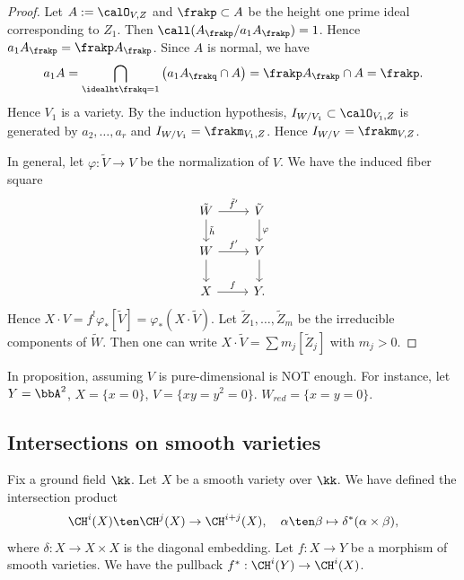 \begin{proof}
    Let $A := \calO_{V,Z}$ and $\frakp \subset A$ be the height one prime ideal corresponding to $Z_1$.
    Then $\call(A_\frakp/a_1 A_\frakp) = 1$.
    Hence $a_1 A_\frakp = \frakp A_\frakp$.
    Since $A$ is normal, we have 
    \[ a_1 A = \bigcap_{\idealht \frakq = 1} \left( a_1 A_\frakq \cap A \right) = \frakp A_\frakp \cap A = \frakp. \]
    Hence $V_1$ is a variety.
    By the induction hypothesis, $I_{W/V_1} \subset \calO_{V_1, Z}$ is generated by $a_2, \dots, a_r$ and $I_{W/V_1} = \frakm_{V_1, Z}$.
    Hence $I_{W/V} = \frakm_{V,Z}$.

    In general, let $\varphi: \tilde{V} \to V$ be the normalization of $V$.
    We have the induced fiber square
    \[
      \begin{tikzcd}
        \tilde{W} \arrow[d, "\tilde{h}"] \arrow[r, "\tilde{f}'"] & \tilde{V} \ar[d, "\varphi"] \\
        W \arrow[r, "f'"] \ar[d] & V \ar[d] \\
        X \arrow[r, "f"]  & Y.
      \end{tikzcd}
    \]
    Hence $X \cdot V = f^! \varphi_* [\tilde{V}] = \varphi_* (X \cdot \tilde{V})$.
    Let $\tilde{Z}_1, \dots, \tilde{Z}_m$ be the irreducible components of $\tilde{W}$.
    Then one can write $X \cdot \tilde{V} = \sum m_j [\tilde{Z}_j]$ with $m_j > 0$.

    \Yang{}
  \end{proof}

  \begin{example}
    In proposition\Yang{}, assuming $V$ is pure-dimensional is NOT enough.
    For instance, let $Y = \bbA^2$, $X = \{x=0\}$, $V = \{xy=y^2=0\}$.
    $W_{red} = \{x=y=0\}$.

    \Yang{}
  \end{example}



\subsection{Intersections on smooth varieties}

  Fix a ground field $\kk$.
  Let $X$ be a smooth variety over $\kk$.
  We have defined the intersection product 
  \[ \CH^i(X) \ten \CH^j(X) \to \CH^{i+j}(X), \quad \alpha \ten \beta \mapsto \delta^* (\alpha \times \beta), \]
  where $\delta: X \to X \times X$ is the diagonal embedding.
  Let $f:X \to Y$ be a morphism of smooth varieties.
  We have the pullback $f^*: \CH^i(Y) \to \CH^i(X)$.


